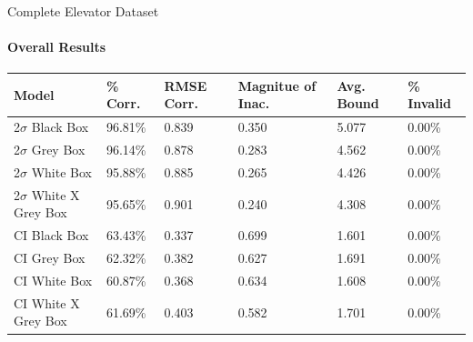 \documentclass{beamer}
\begin{document}
\begin{frame}[t]{Complete Elevator Dataset}
  \framesubtitle{Overall Results}

  \vspace*{-0.5cm}
  \begin{table}[htp!]
  \small
  \begin{tabular}{|p{2.5cm}|p{1.3cm}|p{1.0cm}|p{1.7cm}|p{1.0cm}|p{1.5cm}|}

      \hline
      \textbf{Model} &
      \textbf{\% Corr.} &
      \textbf{RMSE Corr.} &
      \textbf{Magnitue of Inac.} &
      \textbf{Avg. Bound} &
      \textbf{\% Invalid} \\
      \hline

      2$\sigma$ Black Box &
      96.81\% &
      0.839 &
      0.350 &
      5.077 &
      0.00\% \\
      \hline

      2$\sigma$ Grey Box &
      96.14\% &
      0.878 &
      0.283 &
      4.562 &
      0.00\% \\
      \hline

      2$\sigma$ White Box &
      95.88\% &
      0.885 &
      0.265 &
      4.426 &
      0.00\% \\
      \hline

      2$\sigma$ White X Grey Box &
      95.65\% &
      0.901 &
      0.240 &
      4.308 &
      0.00\% \\
      \hline

      CI Black Box &
      63.43\% &
      0.337 &
      0.699 &
      1.601 &
      0.00\% \\
      \hline

      CI Grey Box &
      62.32\% &
      0.382 &
      0.627 &
      1.691 &
      0.00\% \\
      \hline

      CI White Box &
      60.87\% &
      0.368 &
      0.634 &
      1.608 &
      0.00\% \\
      \hline

      CI White X Grey Box &
      61.69\% &
      0.403 &
      0.582 &
      1.701 &
      0.00\% \\
      \hline


  \end{tabular}
  \end{table}


\end{frame}
\end{document}

